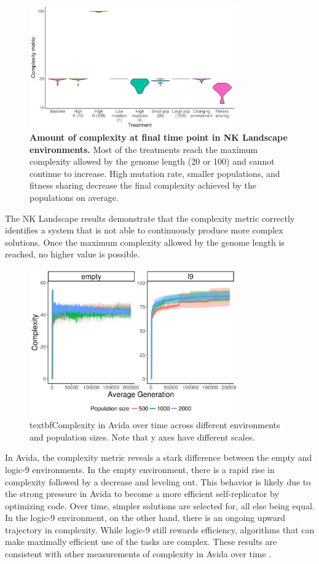 \documentclass[letterpaper]{article}
\begin{document}
\begin{figure}
\includegraphics[width=3.5in]{figs/complexityboxplots.png}
\caption{\textbf{Amount of complexity at final time point in NK Landscape environments.} Most of the treatments reach the maximum complexity allowed by the genome length (20 or 100) and cannot continue to increase. High mutation rate, smaller populations, and fitness sharing decrease the final complexity achieved by the populations on average.}
\label{complexity}
\end{figure}

The NK Landscape results demonstrate that the complexity metric correctly identifies a system that is not able to continuously produce more complex solutions. Once the maximum complexity allowed by the genome length is reached, no higher value is possible. 

\begin{figure}
    \centering
    \includegraphics[width=3.5in]{figs/avida_env_complexity.png}
    \caption{textbf{Complexity in Avida over time across different environments and population sizes.} Note that y axes have different scales.}
    \label{fig:avida_env_complexity}
\end{figure}

In Avida, the complexity metric reveals a stark difference between the empty and logic-9 environments. In the empty environment, there is a rapid rise in complexity followed by a decrease and leveling out. This behavior is likely due to the strong pressure in Avida to become a more efficient self-replicator by optimizing code. Over time, simpler solutions are selected for, all else being equal. In the logic-9 environment, on the other hand, there is an ongoing upward trajectory in complexity. While logic-9 still rewards efficiency, algorithms that can make maximally efficient use of the tasks are complex. These results are consistent with other measurements of complexity in Avida over time \citep{adami_evolution_2000}.
\end{document}

